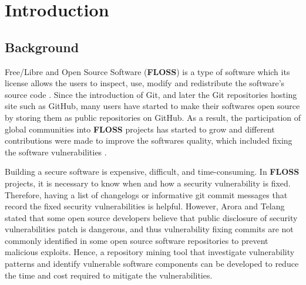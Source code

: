 \documentclass[12pt, a4paper]{report}
\begin{document}
\newpage




\tableofcontents



\newpage


\chapter{Introduction}
\section{Background}
Free/Libre and Open Source Software (\textbf{FLOSS}) is a type of software which its license allows
the users to inspect, use, modify and redistribute the software's source code \cite{crowston_2012}.
Since the introduction of Git, and later the Git repositories hosting site such as GitHub, many
users have started to make their softwares open source by storing them as public repositories on
GitHub. As a result, the participation of global communities into \textbf{FLOSS} projects has
started to grow and different contributions were made to improve the softwares quality, which
included fixing the software vulnerabilities \cite{dabbish_2012}.

Building a secure software is expensive, difficult, and time-consuming. In \textbf{FLOSS} projects,
it is necessary to know when and how a security vulnerability is fixed. Therefore, having a list of
changelogs or informative git commit messages that record the fixed security vulnerabilities is
helpful. However, Arora and Telang \cite{arora_2005} stated that some open source developers believe
that public disclosure of security vulnerabilities patch is dangerous, and thus vulnerability fixing
commits are not commonly identified in some open source software repositories to prevent malicious
exploits. Hence, a repository mining tool that investigate vulnerability patterns and
identify vulnerable software components can be developed to reduce the time and cost required to
mitigate the vulnerabilities.
\end{document}
